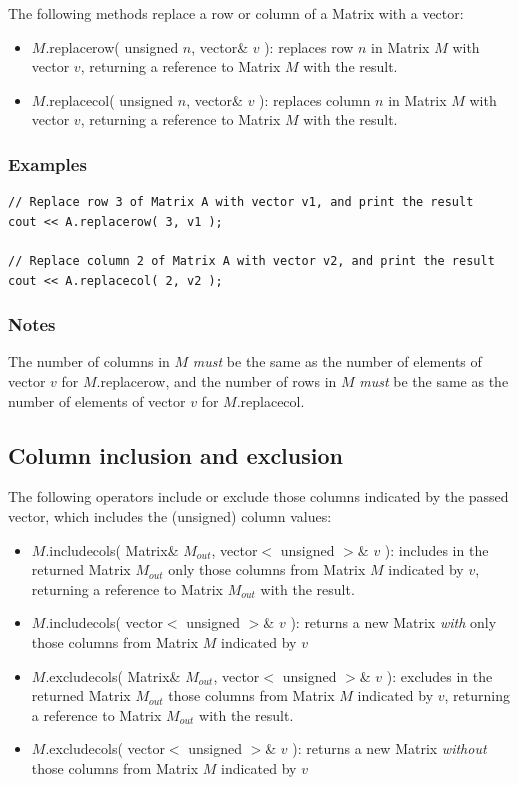 \documentclass{report}
\begin{document}
The following methods replace a row or column of a Matrix with a
vector:

\begin{itemize}
\item $M$.replacerow( unsigned $n$, vector\& $v$ ): replaces row $n$
      in Matrix $M$ with vector $v$, returning a reference to Matrix
      $M$ with the result.
\item $M$.replacecol( unsigned $n$, vector\& $v$ ): replaces column
      $n$ in Matrix $M$ with vector $v$, returning a reference to
      Matrix $M$ with the result.
\end{itemize}

\subsubsection{Examples}

\begin{verbatim}
// Replace row 3 of Matrix A with vector v1, and print the result
cout << A.replacerow( 3, v1 );

// Replace column 2 of Matrix A with vector v2, and print the result
cout << A.replacecol( 2, v2 );
\end{verbatim}

\subsubsection{Notes}

The number of columns in $M$ {\em must} be the same as the number of
elements of vector $v$ for $M$.replacerow, and the number of rows in
$M$ {\em must} be the same as the number of elements of vector $v$ for
$M$.replacecol.

\subsection{Column inclusion and exclusion}

The following operators include or exclude those columns indicated by
the passed vector, which includes the (unsigned) column values:

\begin{itemize}
\item $M$.includecols( Matrix\& $M_{out}$, vector$<$ unsigned $>$\&
      $v$ ): includes in the returned Matrix $M_{out}$ only those
      columns from Matrix $M$ indicated by $v$, returning a reference
      to Matrix $M_{out}$ with the result.
\item $M$.includecols( vector$<$ unsigned $>$\& $v$ ): returns a new
      Matrix {\em with} only those columns from Matrix $M$ indicated
      by $v$
\item $M$.excludecols( Matrix\& $M_{out}$, vector$<$ unsigned $>$\&
      $v$ ): excludes in the returned Matrix $M_{out}$ those columns
      from Matrix $M$ indicated by $v$, returning a reference to
      Matrix $M_{out}$ with the result.
\item $M$.excludecols( vector$<$ unsigned $>$\& $v$ ): returns a new
      Matrix {\em without} those columns from Matrix $M$ indicated by
      $v$
\end{itemize}
\end{document}
